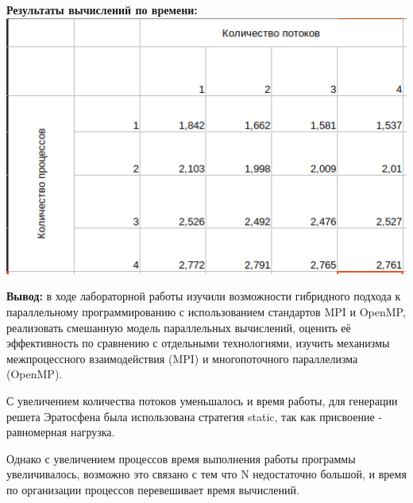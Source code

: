 \documentclass[a4paper,14pt]{extarticle}
\begin{document}
\textbf{Результаты вычислений по времени:}\\
\includegraphics[width=140mm]{exp}


\textbf{Вывод: } в ходе лабораторной работы изучили возможности гибридного подхода к параллельному
программированию с использованием стандартов MPI и OpenMP, реализовать смешанную
модель параллельных вычислений, оценить её эффективность по сравнению с отдельными
технологиями, изучить механизмы межпроцессного взаимодействия (MPI) и многопоточного
параллелизма (OpenMP).

С увеличением количества потоков уменьшалось и время работы, для генерации решета Эратосфена
была использована стратегия static, так как присвоение - равномерная нагрузка. 

Однако с увеличением процессов время выполнения работы программы увеличивалось, возможно это связано
с тем что N недостаточно большой, и время по организации процессов перевешивает время вычислений. 
\end{document}
